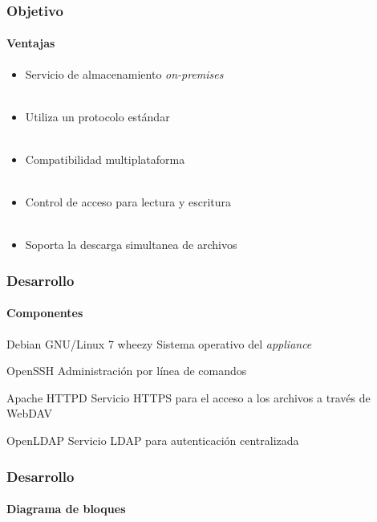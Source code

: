 \documentclass{beamer}
\begin{document}
\begin{frame}
\frametitle{Objetivo}
\framesubtitle{Ventajas}
\justifying

\begin{itemize}
\justifying
  \item Servicio de almacenamiento \textit{on-premises}
\\~\\
  \item Utiliza un protocolo est\'{a}ndar
\\~\\
  \item Compatibilidad multiplataforma
\\~\\
  \item Control de acceso para lectura y escritura
\\~\\
  \item Soporta la descarga simultanea de archivos
\end{itemize}

\end{frame}

\begin{frame}
\frametitle{Desarrollo}
\framesubtitle{Componentes}
\justifying

\begin{block}{Debian GNU/Linux 7 \guillemotleft wheezy\guillemotright}
 Sistema operativo del \textsl{appliance}
\end{block}
\begin{block}{OpenSSH}
 Administraci\'{o}n por l\'{i}nea de comandos
\end{block}
\begin{block}{Apache HTTPD}
 Servicio HTTPS para el acceso a los archivos a trav\'{e}s de WebDAV
\end{block}
\begin{block}{OpenLDAP}
 Servicio LDAP para autenticaci\'{o}n centralizada
\end{block}

\end{frame}

\begin{frame}
\frametitle{Desarrollo}
\framesubtitle{Diagrama de bloques}
\centering
 {
  
 }

\end{frame}
\end{document}
